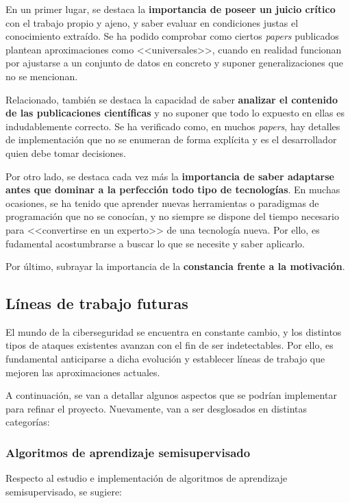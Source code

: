 En un primer lugar, se destaca la \textbf{importancia de poseer un juicio crítico} con el trabajo propio y ajeno, y saber evaluar en condiciones justas el conocimiento extraído. Se ha podido comprobar como ciertos \textit{papers} publicados plantean aproximaciones como <<universales>>, cuando en realidad funcionan por ajustarse a un conjunto de datos en concreto y suponer generalizaciones que no se mencionan.

Relacionado, también se destaca la capacidad de saber \textbf{analizar el contenido de las publicaciones científicas} y no suponer que todo lo expuesto en ellas es indudablemente correcto. Se ha verificado como, en muchos \textit{papers}, hay detalles de implementación que no se enumeran de forma explícita y es el desarrollador quien debe tomar decisiones.

Por otro lado, se destaca cada vez más la \textbf{importancia de saber adaptarse antes que dominar a la perfección todo tipo de tecnologías}. En muchas ocasiones, se ha tenido que aprender nuevas herramientas o paradigmas de programación que no se conocían, y no siempre se dispone del tiempo necesario para <<convertirse en un experto>> de una tecnología nueva. Por ello, es fudamental acostumbrarse a buscar lo que se necesite y saber aplicarlo.

Por último, subrayar la importancia de la \textbf{constancia frente a la motivación}.


\subsection{Líneas de trabajo futuras}

El mundo de la ciberseguridad se encuentra en constante cambio, y los distintos tipos de ataques existentes avanzan con el fin de ser indetectables. Por ello, es fundamental anticiparse a dicha evolución y establecer líneas de trabajo que mejoren las aproximaciones actuales.

A continuación, se van a detallar algunos aspectos que se podrían implementar para refinar el proyecto. Nuevamente, van a ser desglosados en distintas categorías:

\subsubsection{Algoritmos de aprendizaje semisupervisado}

Respecto al estudio e implementación de algoritmos de aprendizaje semisupervisado, se sugiere:

